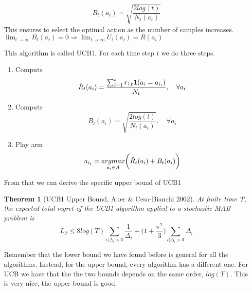 \documentclass[main.tex]{subfiles}
\newtheorem{theorem}{Theorem}[section]
\begin{document}
\begin{equation}
    B_t(a_i) = \sqrt{\frac{2log(t)}{N_t(a_i)}}
\end{equation}
This ensures to select the optimal action as the number of samples increases. $\lim_{t \rightarrow \infty} B_t(a_i) = 0 \Rightarrow \lim_{t \rightarrow \infty} U_t(a_i) = R(a_i)$
\par \noindent
This algorithm is called UCB1. For each time step $t$ we do three steps.
\begin{enumerate}
    \item Compute
          \begin{equation*}
              \Hat{R}_t(a_i) = \frac{\sum_{i=1}^t r_{i,t} \mathbf{1}(a_i=a_{i_t})}{N_t}, \quad \forall a_i
          \end{equation*}
    \item Compute
          \begin{equation*}
              B_t(a_i) = \sqrt{\frac{2log(t)}{N_t(a_i)}}, \quad \forall a_i
          \end{equation*}
    \item Play arm
          \begin{equation*}
              a_{i_t} = \underset{a_i \in A}{argmax}\bigg( \Hat{R}_t(a_i) + B_t(a_i) \bigg)
          \end{equation*}
\end{enumerate}
From that we can derive the specific upper bound of UCB1
\begin{theorem}[UCB1 Upper Bound, Auer \& Cesa-Bianchi 2002]
    At finite time T, the expected total regret of the UCB1 algorithm applied to a
    stochastic MAB problem is
    \begin{equation*}
        L_T \leq 8log(T) \sum_{i|\Delta_i > 0} \frac{1}{\Delta_i} + \bigg( 1+ \frac{\pi^2}{3} \bigg) \sum_{i|\Delta_i > 0} \Delta_i
    \end{equation*}
\end{theorem}
\par \noindent
Remember that the lower bound we have found before is general for all the algorithms. Instead, for the upper bound, every algorithm has a different one. For UCB we have that the the two bounds depends on the same order, $log(T)$. This is very nice, the upper bound is good.
\end{document}
